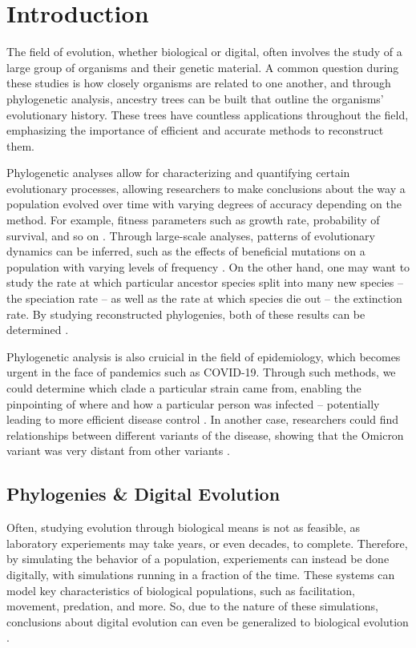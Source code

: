 \section{Introduction} \label{sec:introduction}

The field of evolution, whether biological or digital, often involves the study of a large group of organisms and their genetic material. A common question during these studies is how closely organisms are related to one another, and through phylogenetic analysis, ancestry trees can be built that outline the organisms' evolutionary history. These trees have countless applications throughout the field, emphasizing the importance of efficient and accurate methods to reconstruct them.

Phylogenetic analyses allow for characterizing and quantifying certain evolutionary processes, allowing researchers to make conclusions about the way a population evolved over time with varying degrees of accuracy depending on the method. For example, fitness parameters such as growth rate, probability of survival, and so on \citep{genthon2023cell}. Through large-scale analyses, patterns of evolutionary dynamics can be inferred, such as the effects of beneficial mutations on a population with varying levels of frequency \citep{levy2015quantitative}. On the other hand, one may want to study the rate at which particular ancestor species split into many new species -- the speciation rate -- as well as the rate at which species die out -- the extinction rate. By studying reconstructed phylogenies, both of these results can be determined \citep{stadler2013recovering}.

Phylogenetic analysis is also cruicial in the field of epidemiology, which becomes urgent in the face of pandemics such as COVID-19. Through such methods, we could determine which clade a particular strain came from, enabling the pinpointing of where and how a particular person was infected -- potentially leading to more efficient disease control \citep{wang2020role}. In another case, researchers could find relationships between different variants of the disease, showing that the Omicron variant was very distant from other variants \citep{kandeel2021omicron}.

\subsection{Phylogenies \& Digital Evolution}

Often, studying evolution through biological means is not as feasible, as laboratory experiements may take years, or even decades, to complete. Therefore, by simulating the behavior of a population, experiements can instead be done digitally, with simulations running in a fraction of the time. These systems can model key characteristics of biological populations, such as facilitation, movement, predation, and more. So, due to the nature of these simulations, conclusions about digital evolution can even be generalized to biological evolution \citep{dolson2021digital}.

